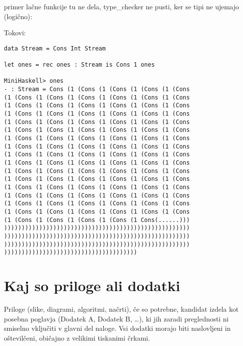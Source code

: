 \documentclass[12pt,a4paper,openany]{book}
\begin{document}
primer lačne funkcije tu ne dela, type\_checker ne pusti, ker se tipi ne ujemajo (logično):


Tokovi:
\begin{lstlisting}
data Stream = Cons Int Stream
  
let ones = rec ones : Stream is Cons 1 ones

MiniHaskell> ones
- : Stream = Cons (1 (Cons (1 (Cons (1 (Cons (1 (Cons 
(1 (Cons (1 (Cons (1 (Cons (1 (Cons (1 (Cons (1 (Cons 
(1 (Cons (1 (Cons (1 (Cons (1 (Cons (1 (Cons (1 (Cons 
(1 (Cons (1 (Cons (1 (Cons (1 (Cons (1 (Cons (1 (Cons 
(1 (Cons (1 (Cons (1 (Cons (1 (Cons (1 (Cons (1 (Cons 
(1 (Cons (1 (Cons (1 (Cons (1 (Cons (1 (Cons (1 (Cons 
(1 (Cons (1 (Cons (1 (Cons (1 (Cons (1 (Cons (1 (Cons 
(1 (Cons (1 (Cons (1 (Cons (1 (Cons (1 (Cons (1 (Cons 
(1 (Cons (1 (Cons (1 (Cons (1 (Cons (1 (Cons (1 (Cons 
(1 (Cons (1 (Cons (1 (Cons (1 (Cons (1 (Cons (1 (Cons 
(1 (Cons (1 (Cons (1 (Cons (1 (Cons (1 (Cons (1 (Cons 
(1 (Cons (1 (Cons (1 (Cons (1 (Cons (1 (Cons (1 (Cons 
(1 (Cons (1 (Cons (1 (Cons (1 (Cons (1 (Cons (1 (Cons 
(1 (Cons (1 (Cons (1 (Cons (1 (Cons (1 (Cons (1 (Cons 
(1 (Cons (1 (Cons (1 (Cons (1 (Cons (1 (Cons (1 (Cons 
(1 (Cons (1 (Cons (1 (Cons (1 (Cons (1 (Cons (1 (Cons 
(1 (Cons (1 (Cons (1 (Cons (1 (Cons (1 Cons(......)))
)))))))))))))))))))))))))))))))))))))))))))))))))))))
)))))))))))))))))))))))))))))))))))))))))))))))))))))
)))))))))))))))))))))))))))))))))))))))))))))))))))))
))))))))))))))))))))))))))))))))))))))
\end{lstlisting}

\newpage


\appendix


\chapter{Kaj so priloge ali dodatki}

Priloge (slike, diagrami, algoritmi, načrti), 
če so potrebne, kandidat izdela kot posebna poglavja (Dodatek A, Dodatek B, \ldots), ki jih zaradi preglednosti ni smiselno vključiti v glavni
del naloge. Vsi dodatki morajo biti naslovljeni in oštevilčeni, običajno z velikimi tiskanimi črkami. 

\newpage

\listoffigures

\newpage

\listoftables




\newpage


\label{stran_literatura}
 
\end{document}
